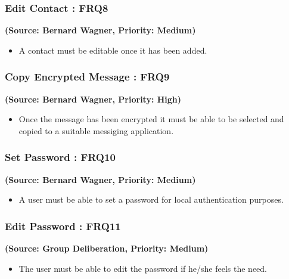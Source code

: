 \subsubsection{Edit Contact : FRQ8}
\textbf{(Source: Bernard Wagner, Priority: Medium)}
\begin{itemize}
\item A contact must be editable once it has been added.
\end{itemize}
\subsubsection{Copy Encrypted Message : FRQ9}
\textbf{(Source: Bernard Wagner, Priority: High)}
\begin{itemize}
\item Once the message has been encrypted it must be able to be selected and copied to a suitable messiging application.
\end{itemize}
\subsubsection{Set Password : FRQ10}
\textbf{(Source: Bernard Wagner, Priority: Medium)}
\begin{itemize}
\item A user must be able to set a password for local authentication purposes.
\end{itemize}
\subsubsection{Edit Password : FRQ11}
\textbf{(Source: Group Deliberation, Priority: Medium)}
\begin{itemize}
\item The user must be able to edit the password if he/she feels the need.
\end{itemize}